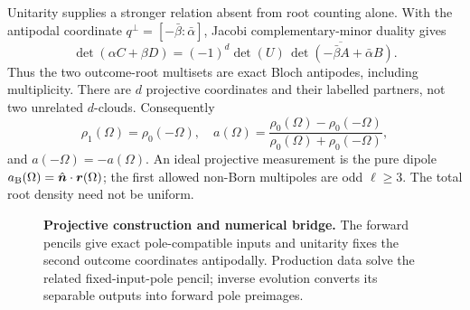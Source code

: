 \documentclass[aps,prl,reprint,superscriptaddress,nofootinbib]{revtex4-2}
\begin{document}
Unitarity supplies a stronger relation absent from root counting alone.  With the antipodal coordinate $q^\perp=[-\bar\beta:\bar\alpha]$, Jacobi complementary-minor duality gives
\begin{equation}
 \det(\alpha C+\beta D)=(-1)^d\det(U)\,
 \overline{\det(-\bar\beta A+\bar\alpha B)}.                                  \label{eq:duality}
\end{equation}
Thus the two outcome-root multisets are exact Bloch antipodes, including multiplicity.  There are $d$ projective coordinates and their labelled partners, not two unrelated $d$-clouds.  Consequently
\begin{equation}
 \rho_1(\Omega)=\rho_0(-\Omega),\quad
 a(\Omega)=\frac{\rho_0(\Omega)-\rho_0(-\Omega)}{\rho_0(\Omega)+\rho_0(-\Omega)},                 \label{eq:asymmetry}
\end{equation}
and $a(-\Omega)=-a(\Omega)$.  An ideal projective measurement is the pure dipole $a_{\rm B}(\Omega)=\hat{\bm n}\cdot\bm r(\Omega)$; the first allowed non-Born multipoles are odd $\ell\geq3$.  The total root density need not be uniform.

\begin{figure}[t]
\centering
{}
\caption{\textbf{Projective construction and numerical bridge.}  The forward pencils give exact pole-compatible inputs and unitarity fixes the second outcome coordinates antipodally.  Production data solve the related fixed-input-pole pencil; inverse evolution converts its separable outputs into forward pole preimages.}
\label{fig:construction}
\end{figure}
\end{document}
